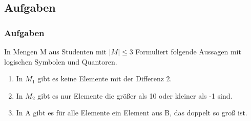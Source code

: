 \subsection{Aufgaben}
\begin{frame}
  \frametitle{Aufgaben}
  \begin{exampleblock}{In Mengen M aus Studenten mit $|M| \leq 3$}
    Formuliert folgende Aussagen mit logischen Symbolen und Quantoren.
    \begin{enumerate}
      \item In $M_1$ gibt es keine Elemente mit der Differenz 2.
      \item In $M_2$ gibt es nur Elemente die größer als 10 oder kleiner als -1 sind.
      \item In A gibt es für alle Elemente ein Element aus B, das doppelt so groß ist.
    \end{enumerate}
  \end{exampleblock}
\end{frame}

